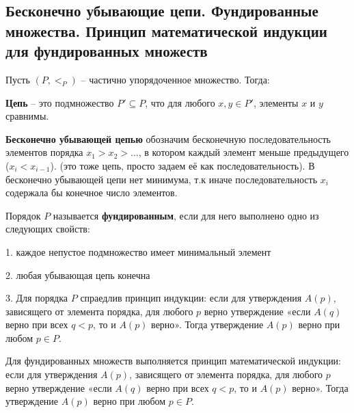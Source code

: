 \subsection{Бесконечно убывающие цепи. Фундированные множества. Принцип математической индукции для фундированных множеств}

Пусть $(P, <_P)$ -- частично упорядоченное множество. Тогда:

\textbf{Цепь} -- это подмножество $P' \subseteq P$, что для любого $x, y \in P'$, элементы $x$ и $y$ сравнимы.

\textbf{Бесконечно убывающей цепью} обозначим бесконечную последовательность элементов порядка $x_1 > x_2 > \ldots$, в котором каждый элемент меньше предыдущего ($x_i < x_{i-1}$). (это тоже цепь, просто задаем её как последовательность). В бесконечно убывающей цепи нет минимума, т.к иначе последовательность $x_i$ содержала бы конечное число элементов.

Порядок $P$ называется \textbf{фундированным}, если для него выполнено одно из следующих свойств:

\hspace{0.5cm}\parbox{17cm} {
    1. каждое непустое подмножество имеет минимальный элемент

    2. любая убывающая цепь конечна

    3. Для порядка $P$ спраедлив принцип индукции: если для утверждения $A(p)$, зависящего от элемента порядка, для любого $p$ верно утверждение «если $A(q)$ верно при всех $q < p$, то и $A(p)$ верно». Тогда утверждение $A(p)$ верно при любом $p \in P$.
}


Для фундированных множеств выполняется принцип математической индукции: если для утверждения $A(p)$, зависящего от элемента порядка, для любого $p$ верно утверждение «если $A(q)$ верно при всех $q < p$, то и $A(p)$ верно». Тогда утверждение $A(p)$ верно при любом $p \in P$.
